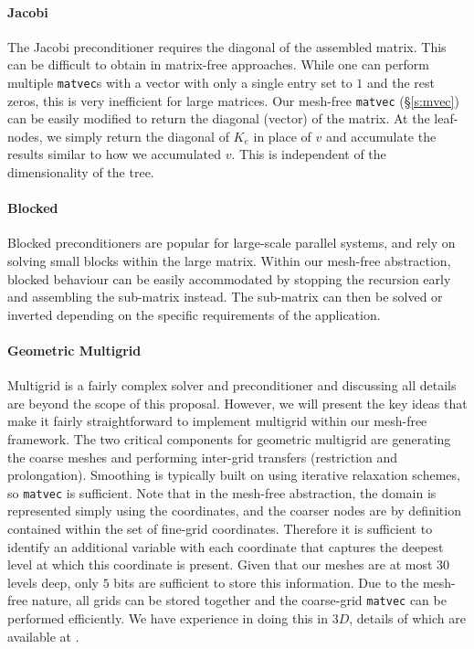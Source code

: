 \paragraph{Jacobi}
The Jacobi preconditioner requires the diagonal of the assembled matrix. This can be difficult to obtain in matrix-free approaches. While one can perform multiple \texttt{matvec}s with a vector with only a single entry set to $1$ and the rest zeros, this is very inefficient for large matrices. Our mesh-free \texttt{matvec} (\S\ref{s:mvec}) can be easily modified to return the diagonal (vector) of the matrix. At the leaf-nodes, we simply return the diagonal of $K_e$ in place of $v$ and accumulate the results similar to how we accumulated $v$. This is independent of the dimensionality of the tree.

\paragraph{Blocked}

Blocked preconditioners are popular for large-scale parallel systems, and rely on solving small blocks within the large matrix. Within our mesh-free abstraction, blocked behaviour can be easily accommodated by stopping the recursion early and assembling the sub-matrix instead. The sub-matrix can then be solved or inverted depending on the specific requirements of the application.

\paragraph{Geometric Multigrid}
Multigrid is a fairly complex solver and preconditioner and discussing all details are beyond the scope of this proposal. However, we will present the key ideas that make it fairly straightforward to implement multigrid within our mesh-free framework. The two critical components for geometric multigrid are generating the coarse meshes and performing inter-grid transfers (restriction and prolongation). Smoothing is typically built on using iterative relaxation schemes, so \texttt{matvec} is sufficient. Note that in the mesh-free abstraction, the domain is represented simply using the coordinates, and the coarser nodes are by definition contained within the set of fine-grid coordinates. Therefore it is sufficient to identify an additional variable with each coordinate that captures the deepest level at which this coordinate is present. Given that our meshes are at most $30$ levels deep, only $5$ bits are sufficient to store this information. Due to the mesh-free nature, all grids can be stored together and the coarse-grid \texttt{matvec} can be performed efficiently. We have experience in doing this in $3D$, details of which are available at \cite{SampathSundarAdavaniEtAl08,SundarBirosBurstedde12}.

